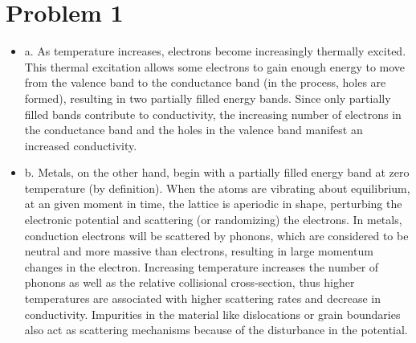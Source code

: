 \documentclass{article}
\numberwithin{equation}{section}
\begin{document}
\section*{Problem 1}
\begin{itemize}
\item a. As temperature increases, electrons become increasingly thermally excited. This thermal excitation allows some electrons to gain enough energy to move from the valence band to the conductance band (in the process, holes are formed), resulting in two partially filled energy bands. Since only partially filled bands contribute to conductivity, the increasing number of electrons in the conductance band and the holes in the valence band manifest an increased conductivity.
\item b. Metals, on the other hand, begin with a partially filled energy band at zero temperature (by definition). When the atoms are vibrating about equilibrium, at an given moment in time, the lattice is aperiodic in shape, perturbing the electronic potential and scattering (or randomizing) the electrons. In metals, conduction electrons will be scattered by phonons, which are considered to be neutral and more massive than electrons, resulting in large momentum changes in the electron. Increasing temperature increases the number of phonons as well as the relative collisional cross-section, thus higher temperatures are associated with higher scattering rates and decrease in conductivity. Impurities in the material like dislocations or grain boundaries also act as scattering mechanisms because of the disturbance in the potential.
\end{itemize}
\end{document}
